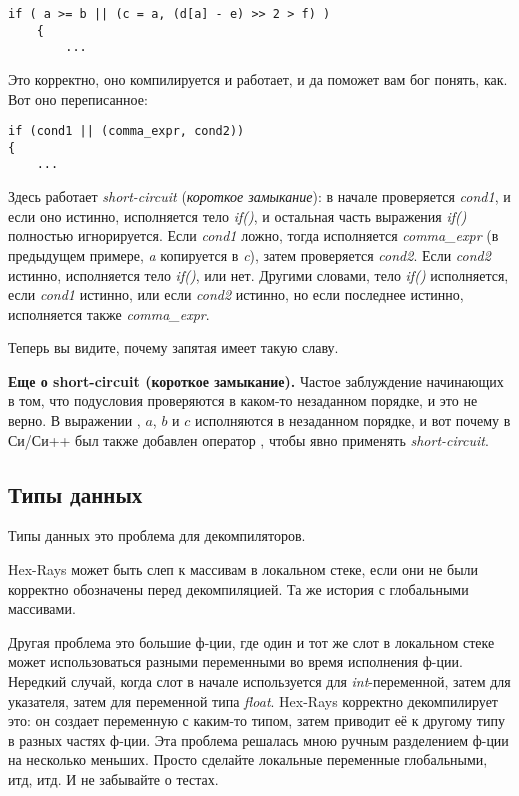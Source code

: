 \begin{lstlisting}[style=customc]
 if ( a >= b || (c = a, (d[a] - e) >> 2 > f) )
    {
    	...
\end{lstlisting}

Это корректно, оно компилируется и работает, и да поможет вам бог понять, как.
Вот оно переписанное:

\begin{lstlisting}[style=customc]
if (cond1 || (comma_expr, cond2))
{
	...
\end{lstlisting}

Здесь работает \emph{short-circuit} (\emph{короткое замыкание}): в начале проверяется \emph{cond1}, и если оно истинно,
исполняется тело \emph{if()}, и остальная часть выражения \emph{if()} полностью игнорируется.
Если \emph{cond1} ложно, тогда исполняется \emph{comma\_expr} (в предыдущем примере, \emph{a} копируется в \emph{c}),
затем проверяется \emph{cond2}.
Если \emph{cond2} истинно, исполняется тело \emph{if()}, или нет.
Другими словами, тело \emph{if()} исполняется, если \emph{cond1} истинно, или если \emph{cond2} истинно,
но если последнее истинно, исполняется также \emph{comma\_expr}.

Теперь вы видите, почему запятая имеет такую славу.

\textbf{Еще о short-circuit (короткое замыкание).}
Частое заблуждение начинающих в том, что подусловия проверяются в каком-то незаданном порядке, и это не верно.
В выражении , $a$, $b$ и $c$ исполняются в незаданном порядке, и вот почему в Си/Си++ был также добавлен
оператор \TT{||}, чтобы явно применять \emph{short-circuit}.

\subsection{Типы данных}

Типы данных это проблема для декомпиляторов.

Hex-Rays может быть слеп к массивам в локальном стеке, если они не были корректно обозначены перед декомпиляцией.
Та же история с глобальными массивами.

Другая проблема это большие ф-ции, где один и тот же слот в локальном стеке может использоваться разными переменными
во время исполнения ф-ции.
Нередкий случай, когда слот в начале используется для \emph{int}-переменной, затем для указателя, затем для переменной типа
\emph{float}.
Hex-Rays корректно декомпилирует это: он создает переменную с каким-то типом, затем приводит её к другому типу в разных частях
ф-ции.
Эта проблема решалась мною ручным разделением ф-ции на несколько меньших.
Просто сделайте локальные переменные глобальными, итд, итд.
И не забывайте о тестах.

